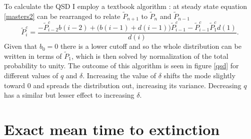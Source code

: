 To calculate the QSD I employ a textbook algorithm \cite{Nisbet1982}: at steady state equation \ref{masters2} can be rearranged to relate $\tilde{P}_{n+1}$ to $\tilde{P}_n$ and $\tilde{P}_{n-1}$
\begin{equation}
\widetilde{P}^c_{i} = \frac{- \widetilde{P}^c_{i-2}b(i-2) 
	+ \big(b(i-1)+d(i-1)\big)\widetilde{P}^c_{i-1} 
	- \widetilde{P}^c_{i-1}\widetilde{P}^c_{1}d(1)}{d(i)}.
\end{equation}
Given that $b_0=0$ there is a lower cutoff and so the whole distribution can be written in terms of $\tilde{P}_1$, which is then solved by normalization of the total probability to unity. 
The outcome of this algorithm is seen in figure \ref{qsd} for different values of $q$ and $\delta$. 
Increasing the value of $\delta$ shifts the mode slightly toward $0$ and spreads the distribution out, increasing its variance. 
Decreasing $q$ has a similar but lesser effect to increasing $\delta$. %


\section{Exact mean time to extinction}%

